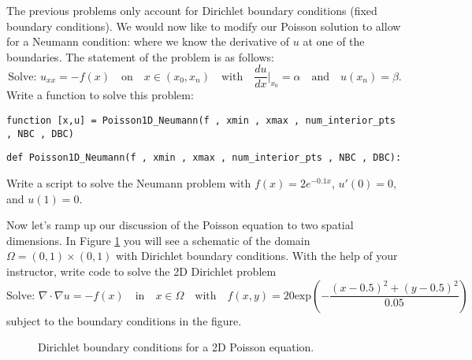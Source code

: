 \begin{problem}
The previous problems only account for Dirichlet boundary conditions (fixed boundary
conditions).  We would now like to modify our Poisson solution to allow for a Neumann
condition: where we know the derivative of $u$ at one of the boundaries.  The
statement of the problem is as follows:
    \[ \text{Solve: } u_{xx} = - f(x) \quad \text{on} \quad x \in (x_0,x_n) \quad \text{with} \quad
    \frac{du}{dx}\Big|_{x_0} = \alpha \quad \text{and} \quad u(x_n) = \beta. \]
    Write a function to solve this problem:
    \ifnum{}
\begin{lstlisting}
function [x,u] = Poisson1D_Neumann(f , xmin , xmax , num_interior_pts , NBC , DBC)
\end{lstlisting}
\else
\begin{lstlisting}
def Poisson1D_Neumann(f , xmin , xmax , num_interior_pts , NBC , DBC):
\end{lstlisting}
\fi

    Write a \ProgLang script to solve the Neumann problem with $f(x) = 2e^{-0.1x}$, $u'(0)=0$,
    and $u(1)=0$.
\end{problem}

\begin{problem}
    Now let's ramp up our discussion of the Poisson equation to two spatial dimensions.
    In Figure \ref{fig:2DPoisson_BC} you will see a schematic of the domain
    $\Omega=(0,1)\times (0,1)$ with Dirichlet boundary conditions.  With the help of your
    instructor, write code to solve the 2D Dirichlet problem
    \[ \text{Solve: } \nabla \cdot \nabla u = - f(x) \quad \text{in} \quad x \in \Omega \quad \text{with} \quad
    f(x,y) = 20\text{exp}\left( -\frac{(x-0.5)^2 + (y-0.5)^2}{0.05} \right) \]
    subject to the boundary conditions in the figure.

    \begin{figure}[ht!]
        \centering
        \caption{Dirichlet boundary conditions for a 2D Poisson equation.}
        \label{fig:2DPoisson_BC}
    \end{figure}
\end{problem}






